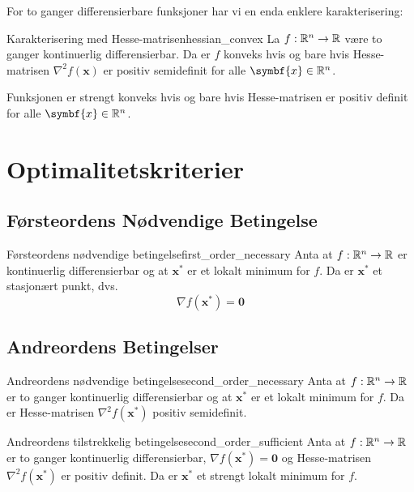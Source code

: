 For to ganger differensierbare funksjoner har vi en enda enklere karakterisering:

\begin{proposition}{Karakterisering med Hesse-matrisen}{hessian_convex}
	La \(f: \mathbb{R}^n \to \mathbb{R}\) være to ganger kontinuerlig differensierbar. Da er \(f\) konveks hvis og bare hvis Hesse-matrisen \(\nabla^2 f(\symbf{x})\) er positiv semidefinit for alle \(\symbf{x} \in \R^n\).

	Funksjonen er strengt konveks hvis og bare hvis Hesse-matrisen er positiv definit for alle \(\symbf{x} \in \R^n\).
\end{proposition}

\section{Optimalitetskriterier}

\subsection{Førsteordens Nødvendige Betingelse}

\begin{theorem}{Førsteordens nødvendige betingelse}{first_order_necessary}
	Anta at \(f: \mathbb{R}^n \to \mathbb{R}\) er kontinuerlig differensierbar og at \(\symbf{x}^\ast\) er et lokalt minimum for \(f\). Da er \(\symbf{x}^\ast\) et stasjonært punkt, dvs.
	\[
		\nabla f(\symbf{x}^\ast) = \symbf{0}
	\]
\end{theorem}

\subsection{Andreordens Betingelser}

\begin{theorem}{Andreordens nødvendige betingelse}{second_order_necessary}
	Anta at \(f: \mathbb{R}^n \to \mathbb{R}\) er to ganger kontinuerlig differensierbar og at \(\symbf{x}^\ast\) er et lokalt minimum for \(f\). Da er Hesse-matrisen \(\nabla^2 f(\symbf{x}^\ast)\) positiv semidefinit.
\end{theorem}

\begin{theorem}{Andreordens tilstrekkelig betingelse}{second_order_sufficient}
	Anta at \(f: \mathbb{R}^n \to \mathbb{R}\) er to ganger kontinuerlig differensierbar, \(\nabla f(\symbf{x}^\ast) = \symbf{0}\) og Hesse-matrisen \(\nabla^2 f(\symbf{x}^\ast)\) er positiv definit. Da er \(\symbf{x}^\ast\) et strengt lokalt minimum for \(f\).
\end{theorem}

